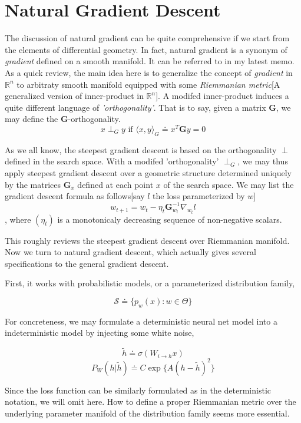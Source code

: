 \documentclass[10pt,a4paper]{article}
\begin{document}
\section{Natural Gradient Descent\cite{Amari1998}\cite{Pascanu2013}}
The discussion of natural gradient can be quite comprehensive if we start from the elements of differential geometry. In fact, natural gradient is a synonym of \textit{gradient} defined on a smooth manifold. It can be referred to in my latest memo\cite{memo}. As a quick review, the main idea here is to generalize the concept of \textit{gradient} in $\mathbb{R}^n$ to arbitraty smooth manifold equipped with some \textit{Riemmanian metric}[A generalized version of inner-product in $\mathbb{R}^n$]. A modifed inner-product induces a quite different language of \textit{'orthogonality'}. That is to say, given a matrix $\mathbf{G}$, we may define the \textbf{G}-orthogonality.
$$
x\perp_{G}{y} \text{ if } \langle{x},y\rangle_{G}\doteq{x}^T\mathbf{G}y=0
$$

As we all know, the steepest gradient descent is based on the orthogonality $\perp$ defined in the search space. With a modifed 'orthogonality' $\perp_{G}$, we may thus apply steepest gradient descent over a geometric structure determined uniquely by the matrices $\mathbf{G}_x$ defined at each point $x$ of the search space. We may list the gradient descent formula as follows[say $\mathit{l}$ the loss parameterized by $w$]
$$
	w_{t+1} = w_{t}-\eta_{t}\mathbf{G}_{w_t}^{-1}\nabla_{w_t}\mathit{l}
$$
, where $(\eta_{t})$ is a monotonicaly decreasing sequence of non-negative scalars.

This roughly reviews the steepest gradient descent over Riemmanian manifold. Now we turn to natural gradient descent, which actually gives several specifications to the general gradient descent.

First, it works with probabilistic models, or a parameterized  distribution family,

$$
	 \mathcal{S} \doteq{\{p_{w}(x):w\in\Theta\}}
$$  

For concreteness, we may formulate a deterministic neural net model into a indeterministic model by injecting some white noise,

$$
\tilde{h} \doteq \sigma(W_{i\to{h}}x)
$$
$$
P_{W}(h|\tilde{h}) \doteq C\exp\{A(h-\tilde{h})^2\}
$$

Since the loss function can be similarly formulated as in the deterministic notation, we will omit here. How to define a proper Riemmanian metric over the underlying parameter manifold of the distribution family seems more essential.
\end{document}

